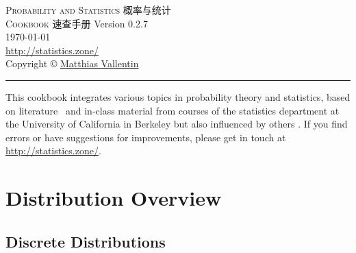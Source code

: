 \documentclass[landscape]{article}
\newcommand{\version}{0.2.7}
\def\web{\url{http://statistics.zone/}}
\begin{document}
\thispagestyle{empty}
\begin{center}
  \vspace*{\fill}
  \textsc{\Huge Probability and Statistics 概率与统计\\[2ex] \huge Cookbook 速查手册}
  \vfill
  \footnotesize{
    Version \version\\[1ex]
    \today\\[1ex]
    \web\\[1ex]
    Copyright \copyright{}
    \href{http://matthias.vallentin.net}{Matthias Vallentin}\\
  }
\end{center}

\newpage

\thispagestyle{empty}
\begin{multicols*}{3}
  \tableofcontents
  \vfill
  \hrule
  \vspace{5pt}
  {\footnotesize This cookbook integrates various topics in probability theory
  and statistics, based on literature~\cite{Hoel72,Wasserman03,Shumway06}
  and in-class material from courses of the statistics department at the
  University of California in Berkeley but also influenced by others
  \cite{Steger01,Steger02}. If you find errors or have suggestions for
  improvements, please get in touch at \web.}
\end{multicols*}

\newpage

\section{Distribution Overview}

\subsection{Discrete Distributions}
\end{document}
